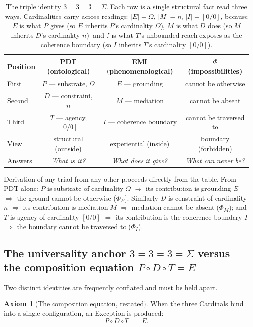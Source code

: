 \documentclass[11pt,a4paper]{article}
\theoremstyle{definition}
\newtheorem{axiom}[theorem]{Axiom}
\theoremstyle{remark}
\begin{document}
\begin{table}[h]
\centering
\begin{tabular}{@{}l c c c@{}}
\toprule
Position & PDT (ontological) & EMI (phenomenological) & $\Phi$ (impossibilities)\\
\midrule
First & $P$ --- substrate, $\Omega$ & $E$ --- grounding & cannot be otherwise\\
Second & $D$ --- constraint, $n$ & $M$ --- mediation & cannot be absent\\
Third & $T$ --- agency, $[0/0]$ & $I$ --- coherence boundary & cannot be traversed to\\
\addlinespace
View & structural (outside) & experiential (inside) & boundary (forbidden)\\
Answers & \textit{What is it?} & \textit{What does it give?} & \textit{What can never be?}\\
\bottomrule
\end{tabular}
\caption{The triple identity $3=3=3=\Sigma$. Each row is a single structural fact read three ways. Cardinalities carry across readings: $|E|=\Omega$, $|M|=n$, $|I|=[0/0]$, because $E$ is what $P$ gives (so $E$ inherits $P$'s cardinality $\Omega$), $M$ is what $D$ does (so $M$ inherits $D$'s cardinality $n$), and $I$ is what $T$'s unbounded reach exposes as the coherence boundary (so $I$ inherits $T$'s cardinality $[0/0]$).}
\label{tab:triads}
\end{table}

Derivation of any triad from any other proceeds directly from the table. From PDT alone: $P$ is substrate of cardinality $\Omega$ $\Rightarrow$ its contribution is grounding $E$ $\Rightarrow$ the ground cannot be otherwise ($\Phi_{E}$). Similarly $D$ is constraint of cardinality $n$ $\Rightarrow$ its contribution is mediation $M$ $\Rightarrow$ mediation cannot be absent ($\Phi_{M}$); and $T$ is agency of cardinality $[0/0]$ $\Rightarrow$ its contribution is the coherence boundary $I$ $\Rightarrow$ the boundary cannot be traversed to ($\Phi_{I}$).

\subsection{The universality anchor $3=3=3=\Sigma$ versus the composition equation $P\circ D\circ T = E$}\label{subsec:anchor}

Two distinct identities are frequently conflated and must be held apart.

\begin{axiom}[The composition equation, restated]\label{ax:composition}
When the three Cardinals bind into a single configuration, an Exception is produced:
\[
P \circ D \circ T \;=\; E.
\]
\end{axiom}
\end{document}
